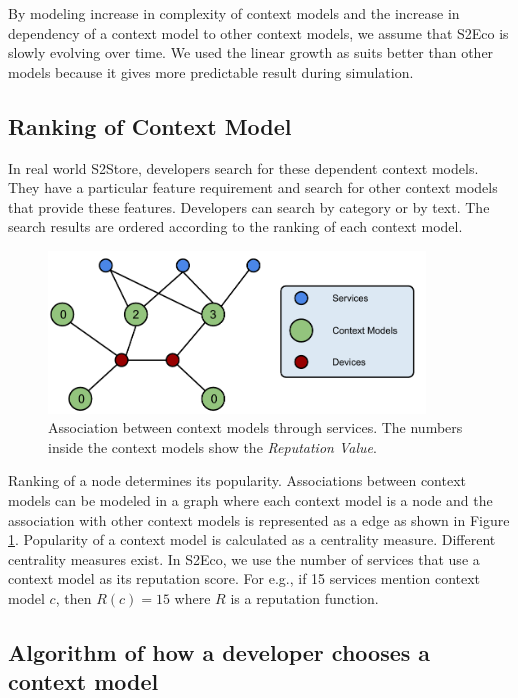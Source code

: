 By modeling increase in complexity of context models and the increase in dependency of a context model to other context models, we assume that S2Eco is slowly evolving over time. We used the linear growth as suits better than other models because it gives more predictable result during simulation.

\subsection{Ranking of Context Model}

In real world S2Store, developers search for these dependent context models. They have a particular feature requirement and search for other context models that provide these features. Developers can search by category or by text. The search results are ordered according to the ranking of each context model.

\begin{figure}[!htb]
  \centering
  \includegraphics[width=10cm]{figures/association_between_context_models.pdf}
  \caption{Association between context models through services. The numbers inside the context models show the \emph{Reputation Value}.}
  \label{fig:association-between-context-models}
\end{figure}

Ranking of a node determines its popularity. Associations between context models can be modeled in a graph where each context model is a node and the association with other context models is represented as a edge as shown in Figure \ref{fig:association-between-context-models}. Popularity of a context model is calculated as a centrality measure. Different centrality measures exist. In S2Eco, we use the number of services that use a context model as its reputation score. For e.g., if 15 services mention context model $c$, then $R(c)=15$ where $R$ is a reputation function.

\subsection{Algorithm of how a developer chooses a context model}

